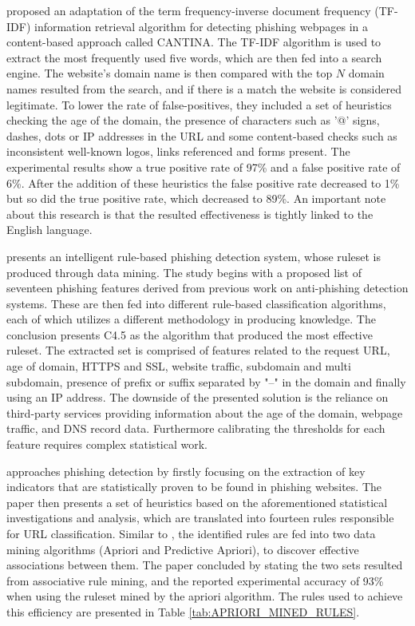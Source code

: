 \cite{CANTINA} proposed an adaptation of the term frequency-inverse document
frequency (TF-IDF) information retrieval algorithm for detecting phishing
webpages in a content-based approach called CANTINA. The TF-IDF algorithm is
used to extract the most frequently used five words, which are then fed into a
search engine. The website's domain name is then compared with the top \(N\)
domain names resulted from the search, and if there is a match the website is
considered legitimate.
To lower the rate of false-positives, they included a set of heuristics checking
the age of the domain, the presence of characters such as '@' signs, dashes,
dots or IP addresses in the URL and some content-based checks such as
inconsistent well-known logos, links referenced and forms present. The
experimental results show a true positive rate of 97\% and a false positive rate
of 6\%. After the addition of these heuristics the false positive rate decreased
to 1\% but so did the true positive rate, which decreased to 89\%. An important
note about this research is that the resulted effectiveness is tightly linked to
the English language.

\cite{RULE_BASED_CLASSIFICATION} presents an intelligent rule-based phishing
detection system, whose ruleset is produced through data mining. The study
begins with a proposed list of seventeen phishing features derived from previous
work on anti-phishing detection systems. These are then fed into different
rule-based classification algorithms, each of which utilizes a different
methodology in producing knowledge. The conclusion presents C4.5 \citep{C4.5} as
the algorithm that produced the most effective ruleset. The extracted set is
comprised of features related to the request URL, age of domain, HTTPS and SSL,
website traffic, subdomain and multi subdomain, presence of prefix or suffix
separated by "--" in the domain and finally using an IP address. The downside of
the presented solution is the reliance on third-party services providing
information about the age of the domain, webpage traffic, and DNS record data.
Furthermore calibrating the thresholds for each feature requires complex
statistical work.

\cite{INTELLIGENT_RULE_MINING} approaches phishing detection by firstly focusing
on the extraction of key indicators that are statistically proven to be found in
phishing websites. The paper then presents a set of heuristics based on the
aforementioned statistical investigations and analysis, which are translated
into fourteen rules responsible for URL classification. Similar to
\cite{RULE_BASED_CLASSIFICATION}, the identified rules are fed into two data
mining algorithms (Apriori and Predictive Apriori), to discover effective
associations between them. The paper concluded by stating the two sets resulted
from associative rule mining, and the reported experimental accuracy of 93\%
when using the ruleset mined by the apriori algorithm. The rules used to achieve
this efficiency are presented in Table \ref{tab:APRIORI_MINED_RULES}.


